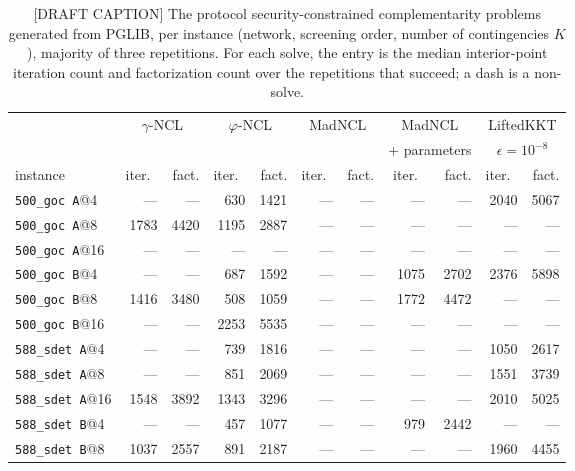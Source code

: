 \begin{table}[tbp]\centering\small\setlength{\tabcolsep}{3pt}
\caption{[DRAFT CAPTION] The protocol security-constrained complementarity problems generated from PGLIB, per instance (network, screening order, number of contingencies $K$), majority of three repetitions. For each solve, the entry is the median interior-point iteration count and factorization count over the repetitions that succeed; a dash is a non-solve.}
\label{tab:gpu-scopf-pglib}
\begin{tabular}{lrrrrrrrrrr}\toprule
 & \multicolumn{2}{c}{$\gamma$-NCL} & \multicolumn{2}{c}{$\varphi$-NCL} & \multicolumn{2}{c}{MadNCL} & \multicolumn{2}{c}{MadNCL} & \multicolumn{2}{c}{LiftedKKT} \\
 & \multicolumn{2}{c}{} & \multicolumn{2}{c}{} & \multicolumn{2}{c}{} & \multicolumn{2}{c}{+ parameters} & \multicolumn{2}{c}{$\epsilon=10^{-8}$} \\
\cmidrule(lr){2-3} \cmidrule(lr){4-5} \cmidrule(lr){6-7} \cmidrule(lr){8-9} \cmidrule(lr){10-11}
instance & iter.\ & fact. & iter.\ & fact. & iter.\ & fact. & iter.\ & fact. & iter.\ & fact. \\\midrule
\texttt{500\_goc~A}@4 & --- & --- & 630 & 1421 & --- & --- & --- & --- & 2040 & 5067 \\
\texttt{500\_goc~A}@8 & 1783 & 4420 & 1195 & 2887 & --- & --- & --- & --- & --- & --- \\
\texttt{500\_goc~A}@16 & --- & --- & --- & --- & --- & --- & --- & --- & --- & --- \\
\texttt{500\_goc~B}@4 & --- & --- & 687 & 1592 & --- & --- & 1075 & 2702 & 2376 & 5898 \\
\texttt{500\_goc~B}@8 & 1416 & 3480 & 508 & 1059 & --- & --- & 1772 & 4472 & --- & --- \\
\texttt{500\_goc~B}@16 & --- & --- & 2253 & 5535 & --- & --- & --- & --- & --- & --- \\
\texttt{588\_sdet~A}@4 & --- & --- & 739 & 1816 & --- & --- & --- & --- & 1050 & 2617 \\
\texttt{588\_sdet~A}@8 & --- & --- & 851 & 2069 & --- & --- & --- & --- & 1551 & 3739 \\
\texttt{588\_sdet~A}@16 & 1548 & 3892 & 1343 & 3296 & --- & --- & --- & --- & 2010 & 5025 \\
\texttt{588\_sdet~B}@4 & --- & --- & 457 & 1077 & --- & --- & 979 & 2442 & --- & --- \\
\texttt{588\_sdet~B}@8 & 1037 & 2557 & 891 & 2187 & --- & --- & --- & --- & 1960 & 4455 \\

\end{tabular}
\end{table}
